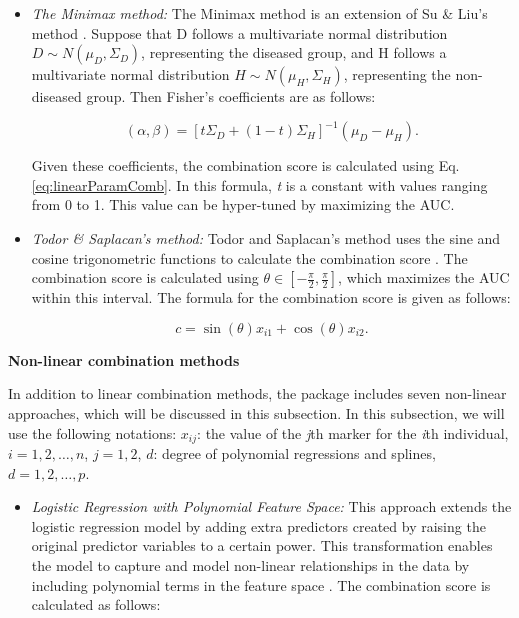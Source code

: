 \begin{itemize}
\item
  \emph{The Minimax method:}
  The Minimax method is an extension of Su \& Liu's method \citep{sameera2016binary}. Suppose that D follows a multivariate normal distribution \(D \sim N(\mu_D, \Sigma_D)\), representing the diseased group, and H follows a multivariate normal distribution \(H \sim N(\mu_H, \Sigma_H)\), representing the non-diseased group. Then Fisher's coefficients are as follows:

  \begin{equation}
  (\alpha, \beta) = [t\Sigma_{D} + (1-t)\Sigma_{H}]^{-1}(\mu_D - \mu_H).
  \label{eq:weightedParam}
  \end{equation}

  Given these coefficients, the combination score is calculated using Eq. \eqref{eq:linearParamComb}. In this formula, \emph{t} is a constant with values ranging from 0 to 1. This value can be hyper-tuned by maximizing the AUC.
\item
  \emph{Todor \& Saplacan's method:}
  Todor and Saplacan's method uses the sine and cosine trigonometric functions to calculate the combination score \citep{todor2014tools}. The combination score is calculated using \(\theta \in \left[-\frac{\pi}{2},\frac{\pi}{2}\right]\), which maximizes the AUC within this interval. The formula for the combination score is given as follows:

  \begin{equation}
  c = \sin(\theta) x_{i1} + \cos(\theta) x_{i2}.
  \label{eq:trigComb}
  \end{equation}
\end{itemize}

\textbf{Non-linear combination methods}

In addition to linear combination methods, the  package includes seven non-linear approaches, which will be discussed in this subsection. In this subsection, we will use the following notations: \(x_{ij}\): the value of the \emph{j}th marker for the \emph{i}th individual, \(i = 1, 2, \ldots, n\), \(j = 1 , 2\), \(d\): degree of polynomial regressions and splines, \(d = 1, 2, \ldots, p\).

\begin{itemize}
\tightlist
\item
  \emph{Logistic Regression with Polynomial Feature Space:}
  This approach extends the logistic regression model by adding extra predictors created by raising the original predictor variables to a certain power. This transformation enables the model to capture and model non-linear relationships in the data by including polynomial terms in the feature space \citep{james2013introduction}. The combination score is calculated as follows:
\end{itemize}

